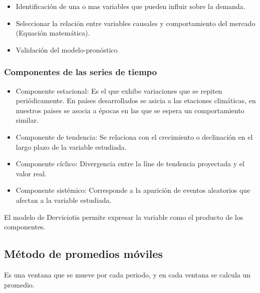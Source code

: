 \documentclass[a4paper, 11pt, oneside]{article}
\begin{document}
\begin{itemize}
	\item Identificación de una o mas variables que pueden influir sobre la demanda.
	\item Seleccionar la relación entre variables causales y comportamiento del mercado (Equación matemática).
	\item Validación del modelo-pronóstico
 \end{itemize}

\subsubsection{Componentes de las series de tiempo}

\begin{itemize}
	\item Componente estacional:
	Es el que exhibe variaciones que se repiten periódicamente. En países desarrollados se asicia a las etaciones
	climáticas, en nuestros paises se asocia a épocas en las que se espera un comportamiento similar.
	\item Componente de tendencia:
	Se relaciona con el crecimiento o declinación en el largo plazo de la variable estudiada.
	\item Componente cíclico:
	Divergencia entre la líne de tendencia proyectada y el valor real.
	\item Componente sistémico:
	Corresponde a la aparición de eventos aleatorios que afectan a la variable estudiada.
\end{itemize}

El modelo de Derviciotis permite expresar la variable como el producto de los componentes.

\subsection {Método de promedios móviles}
Es una ventana que se mueve por cada periodo, y en cada ventana se calcula un promedio.
\end{document}
